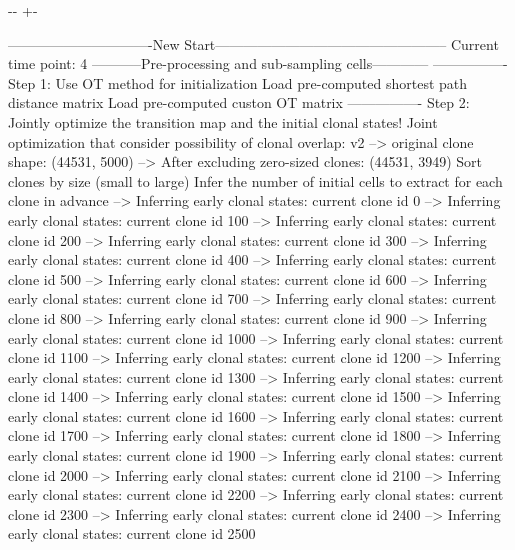 \documentclass[letterpaper,10pt,english]{sphinxmanual}
\newlength\nbsphinxcodecellspacing
\begin{document}
{

\kern-\sphinxverbatimsmallskipamount\kern-\baselineskip
\kern+\FrameHeightAdjust\kern-\fboxrule
\vspace{\nbsphinxcodecellspacing}

\begin{sphinxVerbatim}[commandchars=\\\{\}]
-------------------------------New Start--------------------------------------------------
Current time point: 4
-----------Pre-processing and sub-sampling cells------------
----------------
Step 1: Use OT method for initialization
Load pre-computed shortest path distance matrix
Load pre-computed custon OT matrix
----------------
Step 2: Jointly optimize the transition map and the initial clonal states!
Joint optimization that consider possibility of clonal overlap: v2
--> original clone shape: (44531, 5000)
--> After excluding zero-sized clones: (44531, 3949)
Sort clones by size (small to large)
Infer the number of initial cells to extract for each clone in advance
--> Inferring early clonal states: current clone id 0
--> Inferring early clonal states: current clone id 100
--> Inferring early clonal states: current clone id 200
--> Inferring early clonal states: current clone id 300
--> Inferring early clonal states: current clone id 400
--> Inferring early clonal states: current clone id 500
--> Inferring early clonal states: current clone id 600
--> Inferring early clonal states: current clone id 700
--> Inferring early clonal states: current clone id 800
--> Inferring early clonal states: current clone id 900
--> Inferring early clonal states: current clone id 1000
--> Inferring early clonal states: current clone id 1100
--> Inferring early clonal states: current clone id 1200
--> Inferring early clonal states: current clone id 1300
--> Inferring early clonal states: current clone id 1400
--> Inferring early clonal states: current clone id 1500
--> Inferring early clonal states: current clone id 1600
--> Inferring early clonal states: current clone id 1700
--> Inferring early clonal states: current clone id 1800
--> Inferring early clonal states: current clone id 1900
--> Inferring early clonal states: current clone id 2000
--> Inferring early clonal states: current clone id 2100
--> Inferring early clonal states: current clone id 2200
--> Inferring early clonal states: current clone id 2300
--> Inferring early clonal states: current clone id 2400
--> Inferring early clonal states: current clone id 2500

\end{sphinxVerbatim}}
\end{document}
